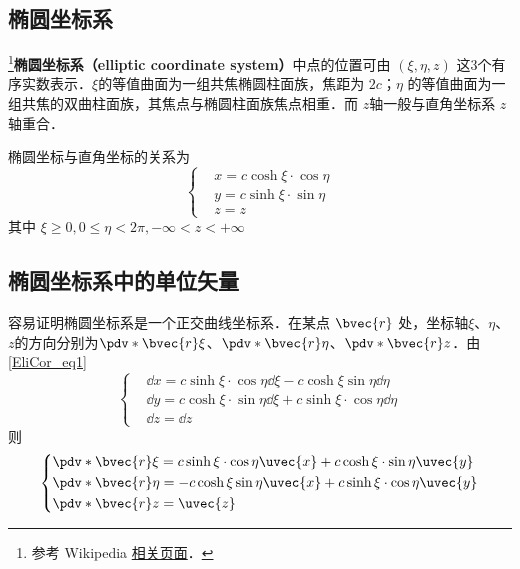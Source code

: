 
\begin{issues}
\issueDraft
\end{issues}


\subsection{椭圆坐标系}
\footnote{参考 Wikipedia \href{https://en.wikipedia.org/wiki/Elliptic_coordinate_system}{相关页面}．}\textbf{椭圆坐标系（elliptic coordinate system）}中点的位置可由 $(\xi,\eta,z)$ 这3个有序实数表示．$\xi$的等值曲面为一组共焦椭圆柱面族，焦距为 $2c$；$\eta$ 的等值曲面为一组共焦的双曲柱面族，其焦点与椭圆柱面族焦点相重．而 $z$轴一般与直角坐标系 $z$ 轴重合．

椭圆坐标与直角坐标的关系为
\begin{equation}\label{EliCor_eq1}
\left\{\begin{aligned}
&x=c\cosh\xi\cdot\cos\eta\\
&y=c\sinh\xi\cdot\sin\eta\\
&z=z
\end{aligned}\right.
\end{equation}
其中 $\xi\geq0,0\leq\eta<2\pi,-\infty<z<+\infty$
\subsection{椭圆坐标系中的单位矢量}
容易证明椭圆坐标系是一个正交曲线坐标系．在某点 $\bvec{r}$ 处，坐标轴$\xi$、$\eta$、$z$的方向分别为$\pdv*{\bvec{r}}{\xi}$、$\pdv*{\bvec{r}}{\eta}$、$\pdv*{\bvec{r}}{z}$．由\autoref{EliCor_eq1} 
\begin{equation}\label{EliCor_eq2}
\left\{
    \begin{aligned}
    &\dd x=c\sinh\xi\cdot\cos\eta\dd\xi-c\cosh\xi\sin\eta\dd\eta\\
    &\dd y=c\cosh\xi\cdot\sin\eta\dd\xi+c\sinh\xi\cdot\cos\eta\dd\eta\\
    &\dd z=\dd z
    \end{aligned}\right.
\end{equation}
则
\begin{equation}
\left\{
    \begin{aligned}
&\pdv*{\bvec{r}}{\xi}=c\sinh\xi\cdot\cos\eta\uvec{x}+c\cosh\xi\cdot\sin\eta\uvec{y}\\
&\pdv*{\bvec{r}}{\eta}=-c\cosh\xi\sin\eta\uvec{x}+c\sinh\xi\cdot\cos\eta\uvec{y}\\
&\pdv*{\bvec{r}}{z}=\uvec{z}
    \end{aligned}\right.
\end{equation}

